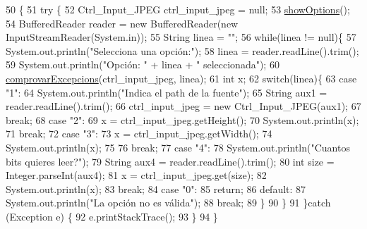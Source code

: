\begin{DoxyCode}
50                                            \{
51     \textcolor{keywordflow}{try} \{
52         Ctrl\_Input\_JPEG ctrl\_input\_jpeg = null;
53         \hyperlink{classpersistencia_1_1input_1_1Driver____Ctrl__Input__JPEG_a3ffde336b648d23ae0a517210d0f8f38}{showOptions}();
54         BufferedReader reader = \textcolor{keyword}{new} BufferedReader(\textcolor{keyword}{new} InputStreamReader(System.in));
55         String linea = \textcolor{stringliteral}{""};
56         \textcolor{keywordflow}{while}(linea != null)\{
57             System.out.println(\textcolor{stringliteral}{"Selecciona una opción:"});
58             linea = reader.readLine().trim();
59             System.out.println(\textcolor{stringliteral}{"Opción: "} + linea + \textcolor{stringliteral}{" seleccionada"});
60             \hyperlink{classpersistencia_1_1input_1_1Driver____Ctrl__Input__JPEG_ad40099d3188e58f93a2a57c4277b754e}{comprovarExcepcions}(ctrl\_input\_jpeg, linea);
61             \textcolor{keywordtype}{int} x;
62             \textcolor{keywordflow}{switch}(linea)\{
63                 \textcolor{keywordflow}{case} \textcolor{stringliteral}{"1"}:
64                     System.out.println(\textcolor{stringliteral}{"Indica el path de la fuente"});
65                     String aux1 = reader.readLine().trim();
66                     ctrl\_input\_jpeg = \textcolor{keyword}{new} Ctrl\_Input\_JPEG(aux1);
67                 \textcolor{keywordflow}{break};
68                 \textcolor{keywordflow}{case} \textcolor{stringliteral}{"2"}:
69                     x = ctrl\_input\_jpeg.getHeight();
70                     System.out.println(x);
71                 \textcolor{keywordflow}{break};
72                 \textcolor{keywordflow}{case} \textcolor{stringliteral}{"3"}:
73                     x = ctrl\_input\_jpeg.getWidth();
74                     System.out.println(x);
75 
76                 \textcolor{keywordflow}{break};
77                 \textcolor{keywordflow}{case} \textcolor{stringliteral}{"4"}:
78                     System.out.println(\textcolor{stringliteral}{"Cuantos bits quieres leer?"});
79                     String aux4 = reader.readLine().trim();
80                     \textcolor{keywordtype}{int} size = Integer.parseInt(aux4);
81                     x = ctrl\_input\_jpeg.get(size);
82                     System.out.println(x);
83                 \textcolor{keywordflow}{break};
84                 \textcolor{keywordflow}{case} \textcolor{stringliteral}{"0"}:
85                     \textcolor{keywordflow}{return};
86                 \textcolor{keywordflow}{default}:
87                     System.out.println(\textcolor{stringliteral}{"La opción no es válida"});
88                 \textcolor{keywordflow}{break};
89             \}
90         \}
91     \}\textcolor{keywordflow}{catch} (Exception e) \{
92         e.printStackTrace();
93     \}
94     \}
\end{DoxyCode}
